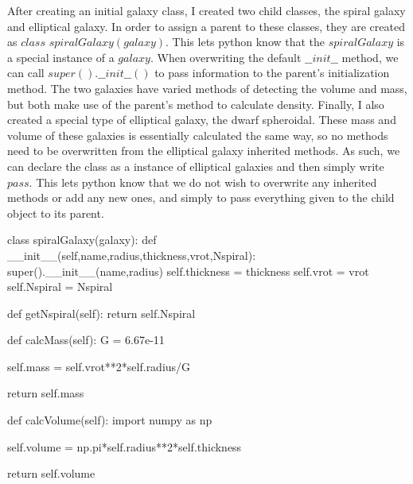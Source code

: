 \documentclass[twocolumn,11pt]{article}
\begin{document}
After creating an initial galaxy class, I created two child classes, the spiral galaxy and elliptical galaxy. In order to assign a parent to these classes, they are created as $class$ $spiralGalaxy(galaxy)$. This lets python know that the $spiralGalaxy$ is a special instance of a $galaxy$. When overwriting the default $\_\_init\_\_$ method, we can call $super().\_\_init\_\_()$ to pass information to the parent's initialization method. The two galaxies have varied methods of detecting the volume and mass, but both make use of the parent's method to calculate density. Finally, I also created a special type of elliptical galaxy, the dwarf spheroidal. These mass and volume of these galaxies is essentially calculated the same way, so no methods need to be overwritten from the elliptical galaxy inherited methods. As such, we can declare the class as a instance of elliptical galaxies and then simply write $pass$. This lets python know that we do not wish to overwrite any inherited methods or add any new ones, and simply to pass everything given to the child object to its parent.
\newline
\begin{python}
class spiralGalaxy(galaxy):
    def __init__(self,name,radius,thickness,vrot,Nspiral):
        super().__init__(name,radius)
        self.thickness = thickness
        self.vrot = vrot
        self.Nspiral = Nspiral
    
    def getNspiral(self):
        return self.Nspiral
    
    def calcMass(self):
        G = 6.67e-11
        
        self.mass = self.vrot**2*self.radius/G
        
        return self.mass
    
    def calcVolume(self):
        import numpy as np
        
        self.volume = np.pi*self.radius**2*self.thickness
        
        return self.volume
\end{python}
\end{document}

